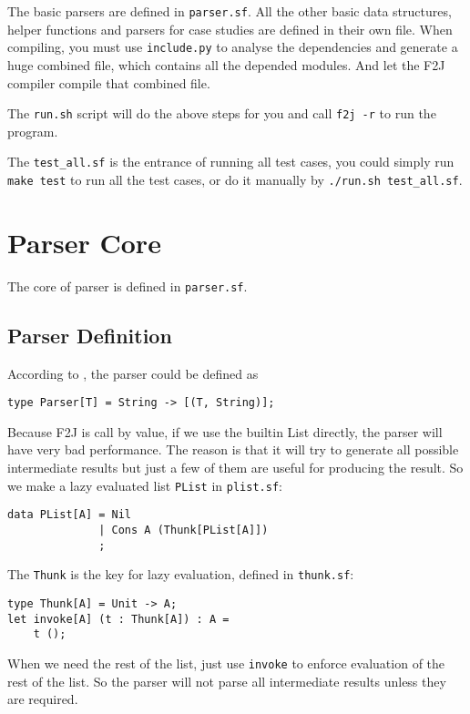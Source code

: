The basic parsers are defined in \texttt{parser.sf}. All the other basic data structures, helper functions and parsers for case studies are defined in their own file. When compiling, you must use \texttt{include.py} to analyse the dependencies and generate a huge combined file, which contains all the depended modules. And let the F2J compiler compile that combined file.

The \texttt{run.sh} script will do the above steps for you and call \texttt{f2j -r} to run the program.

The \texttt{test\_all.sf} is the entrance of running all test cases, you could simply run \texttt{make test} to run all the test cases, or do it manually by \texttt{./run.sh test\_all.sf}.

\section{Parser Core}

The core of parser is defined in \texttt{parser.sf}.

\subsection{Parser Definition}

According to \cite{Hutton:1996}, the parser could be defined as

\begin{lstlisting}
type Parser[T] = String -> [(T, String)];
\end{lstlisting}

Because F2J is call by value, if we use the builtin List directly, the parser will have very bad performance. The reason is that it will try to generate all possible intermediate results but just a few of them are useful for producing the result. So we make a lazy evaluated list \texttt{PList} in \texttt{plist.sf}:

\begin{lstlisting}
data PList[A] = Nil
              | Cons A (Thunk[PList[A]])
              ;
\end{lstlisting}

The \texttt{Thunk} is the key for lazy evaluation, defined in \texttt{thunk.sf}:

\begin{lstlisting}
type Thunk[A] = Unit -> A;
let invoke[A] (t : Thunk[A]) : A =
    t ();
\end{lstlisting}

When we need the rest of the list, just use \texttt{invoke} to enforce evaluation of the rest of the list. So the parser will not parse all intermediate results unless they are required.

